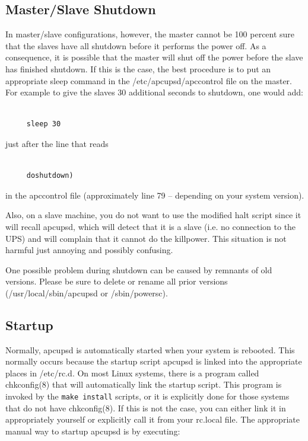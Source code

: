{{{{{{{{{{{{{{{{{\label{Master_002fSlave-Shutdown-_003c1_003e}

\subsection*{Master/Slave Shutdown}

In master/slave configurations, however, the master cannot be 100 percent sure
that the slaves have all shutdown before it performs the power off. As a
consequence, it is possible that the master will shut off the power before the
slave has finished shutdown. If this is the case, the best procedure is to put
an appropriate sleep command in the /etc/apcupsd/apccontrol file on the
master. For example to give the slaves 30 additional seconds to shutdown, one
would add: 

\footnotesize
\begin{verbatim}
     
     sleep 30
\end{verbatim}
\normalsize

just after the line that reads 

\footnotesize
\begin{verbatim}
     
     doshutdown)
\end{verbatim}
\normalsize

in the apccontrol file (approximately line 79 {--} depending on your system
version).  

Also, on a slave machine, you do not want to use the modified halt script
since it will recall apcupsd, which will detect that it is a slave (i.e. no
connection to the UPS) and will complain that it cannot do the killpower. This
situation is not harmful just annoying and possibly confusing.  

One possible problem during shutdown can be caused by remnants of old
versions. Please be sure to delete or rename all prior versions
(/usr/local/sbin/apcupsd or /sbin/powersc). 

\label{Startup}

\subsection*{Startup}

\label{index-Startup-260}
Normally, apcupsd is automatically started when your system is rebooted. This
normally occurs because the startup script apcupsd is linked into the
appropriate places in /etc/rc.d. On most Linux systems, there is a program
called chkconfig(8) that will automatically link the startup script.  This
program is invoked by the {\tt make install} scripts, or it is explicitly done
for those systems that do not have chkconfig(8). If this is not the case, you
can either link it in appropriately yourself or explicitly call it from your
rc.local file. The appropriate manual way to startup apcupsd is by executing: 

}}}}}}}}}}}}}}}}}
